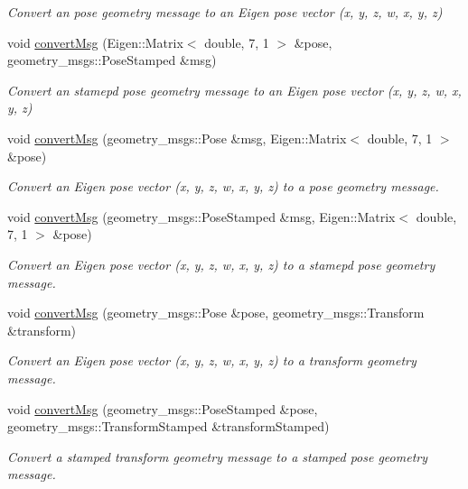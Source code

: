 \begin{DoxyCompactItemize}
\begin{DoxyCompactList}\small\item\em Convert an pose geometry message to an Eigen pose vector (x, y, z, w, x, y, z) \end{DoxyCompactList}\item 
void \hyperlink{group__transport__controller_ga9e842115a5f448ab0e3ba9fea93d5179}{convert\+Msg} (Eigen\+::\+Matrix$<$ double, 7, 1 $>$ \&pose, geometry\+\_\+msgs\+::\+Pose\+Stamped \&msg)
\begin{DoxyCompactList}\small\item\em Convert an stamepd pose geometry message to an Eigen pose vector (x, y, z, w, x, y, z) \end{DoxyCompactList}\item 
void \hyperlink{group__transport__controller_ga7beb50c98e49263d05b3b819be58d76c}{convert\+Msg} (geometry\+\_\+msgs\+::\+Pose \&msg, Eigen\+::\+Matrix$<$ double, 7, 1 $>$ \&pose)
\begin{DoxyCompactList}\small\item\em Convert an Eigen pose vector (x, y, z, w, x, y, z) to a pose geometry message. \end{DoxyCompactList}\item 
void \hyperlink{group__transport__controller_gaf1628de186f2d90b064f8c8b36beef53}{convert\+Msg} (geometry\+\_\+msgs\+::\+Pose\+Stamped \&msg, Eigen\+::\+Matrix$<$ double, 7, 1 $>$ \&pose)
\begin{DoxyCompactList}\small\item\em Convert an Eigen pose vector (x, y, z, w, x, y, z) to a stamepd pose geometry message. \end{DoxyCompactList}\item 
void \hyperlink{group__transport__controller_ga45b2bbef58d2c60ff8eeb77d221f2ab7}{convert\+Msg} (geometry\+\_\+msgs\+::\+Pose \&pose, geometry\+\_\+msgs\+::\+Transform \&transform)
\begin{DoxyCompactList}\small\item\em Convert an Eigen pose vector (x, y, z, w, x, y, z) to a transform geometry message. \end{DoxyCompactList}\item 
void \hyperlink{group__transport__controller_gaf99f4d3d714176ee5a3d235ffabb7d3f}{convert\+Msg} (geometry\+\_\+msgs\+::\+Pose\+Stamped \&pose, geometry\+\_\+msgs\+::\+Transform\+Stamped \&transform\+Stamped)
\begin{DoxyCompactList}\small\item\em Convert a stamped transform geometry message to a stamped pose geometry message. \end{DoxyCompactList}\item 

\end{DoxyCompactItemize}
